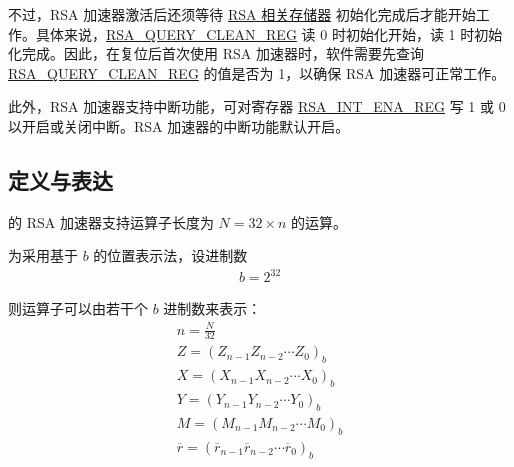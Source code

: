 \documentclass[main\_\_CN.tex]{subfiles}
\begin{document}
不过，RSA 加速器激活后还须等待 \hyperref[sec:mem-sum]{RSA 相关存储器} 初始化完成后才能开始工作。具体来说，\hyperref[regdesc:RSAQUERYCLEANREG]{RSA\_QUERY\_CLEAN\_REG} 读 0 时初始化开始，读 1 时初始化完成。因此，在复位后首次使用 RSA 加速器时，软件需要先查询 \hyperref[regdesc:RSAQUERYCLEANREG]{RSA\_QUERY\_CLEAN\_REG} 的值是否为 1，以确保 RSA 加速器可正常工作。

此外，RSA 加速器支持中断功能，可对寄存器 \hyperref[regdesc:RSAINTENAREG]{RSA\_INT\_ENA\_REG} 写 1 或 0 以开启或关闭中断。RSA 加速器的中断功能默认开启。

\begin{importantlisting}
\vspace{-0.5em}

\end{importantlisting}

\subsection{定义与表达} \label{sec:rsa-definitions-representations}
\chipname{} 的 RSA 加速器支持运算子长度为
\begin{math}N = 32 \times n\end{math} 的运算。

为采用基于 \begin{math}b\end{math} 的位置表示法，设进制数
\begin{gather*}
    b = 2^{32}
\end{gather*}

则运算子可以由若干个 \begin{math}b\end{math} 进制数来表示：
\begin{gather*}
    n = \frac{N}{32} \\
    Z = ( Z_{n-1} Z_{n-2} \cdots Z_{0} )_{b} \\
    X = ( X_{n-1} X_{n-2} \cdots X_{0} )_{b} \\
    Y = ( Y_{n-1} Y_{n-2} \cdots Y_{0} )_{b} \\
    M = ( M_{n-1} M_{n-2} \cdots M_{0} )_{b} \\
    \overline{r} = ( \overline{r}_{n-1} \overline{r}_{n-2} \cdots \overline{r}_{0} )_{b}
\end{gather*}
\end{document}
